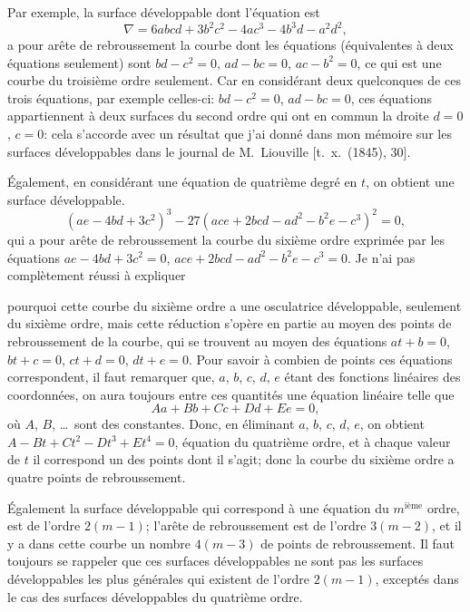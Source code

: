 \documentclass[11pt]{article}
\begin{document}
\medskip
Par exemple, la surface d\'eveloppable dont l'\'equation est
\[
\nabla = 6 a b c d + 3 b^{2} c^{2} - 4 a c^{3} - 4 b^{3} d - a^{2} d^{2},
\]
a pour ar\^ete de rebroussement la courbe dont les \'equations (\'equivalentes \`a deux \'equations
seulement) sont $b d - c^{2} = 0$, $a d - b c = 0$, $a c - b^{2} = 0$, ce qui est une courbe du troisi\`eme ordre
seulement. Car en consid\'erant deux quelconques de ces trois \'equations, par exemple
celles-ci: $b d - c^{2} = 0$, $a d - b c = 0$, ces \'equations appartiennent \`a deux surfaces du second
ordre qui ont en commun la droite $d = 0$, $c = 0$: cela s'accorde avec un r\'esultat que j'ai
donn\'e dans mon m\'emoire sur les surfaces d\'eveloppables dans le journal de M.~Liouville
[t.~x.\ (1845), 30].

\medskip
\'Egalement, en consid\'erant une \'equation de quatri\`eme degr\'e en $t$, on obtient une
surface d\'eveloppable.
\[
(a e - 4 b d + 3 c^{2})^{3} - 27 (a c e + 2 b c d - a d^{2} - b^{2} e - c^{3})^{2} = 0,
\]
qui a pour ar\^ete de rebroussement la courbe du sixi\`eme ordre exprim\'ee par les \'equations
$a e - 4 b d + 3 c^{2} = 0$, $a c e + 2 b c d - a d^{2} - b^{2} e - c^{3} = 0$. Je n'ai pas compl\`etement r\'eussi \`a expliquer

\bigskip

\noindent pourquoi cette courbe du sixi\`eme ordre a une osculatrice d\'eveloppable, seulement du
sixi\`eme ordre, mais cette r\'eduction s'op\`ere en partie au moyen des points de rebrousse\-ment
de la courbe, qui se trouvent au moyen des \'equations $a t + b = 0$, $b t + c = 0$, $c t + d = 0$,
$d t + e = 0$. Pour savoir \`a combien de points ces \'equations correspondent, il faut re\-marquer
que, $a$, $b$, $c$, $d$, $e$ \'etant des fonctions lin\'eaires des coordonn\'ees, on aura toujours
entre ces quantit\'es une \'equation lin\'eaire telle que
\[
A a + B b + C c + D d + E e = 0,
\]
o\`u $A$, $B$, \ldots\ sont des constantes. Donc, en \'eliminant $a$, $b$, $c$, $d$, $e$, on obtient
$A - B t + C t^{2} - D t^{3} + E t^{4} = 0$, \'equation du quatri\`eme ordre, et \`a chaque valeur de $t$ il
correspond un des points dont il s'agit; donc la courbe du sixi\`eme ordre a quatre
points de rebroussement.

\medskip
\'Egalement la surface d\'eveloppable qui correspond \`a une \'equation du $m^{\text{i\`eme}}$ ordre, est
de l'ordre $2(m - 1)$; l'ar\^ete de rebroussement est de l'ordre $3(m - 2)$, et il y a dans
cette courbe un nombre $4 (m - 3)$ de points de rebroussement. Il faut toujours se
rappeler que ces surfaces d\'eveloppables ne sont pas les surfaces d\'eveloppables les plus
g\'en\'erales qui existent de l'ordre $2 (m - 1)$, except\'es dans le cas des surfaces d\'eveloppables
du quatri\`eme ordre.
\end{document}
